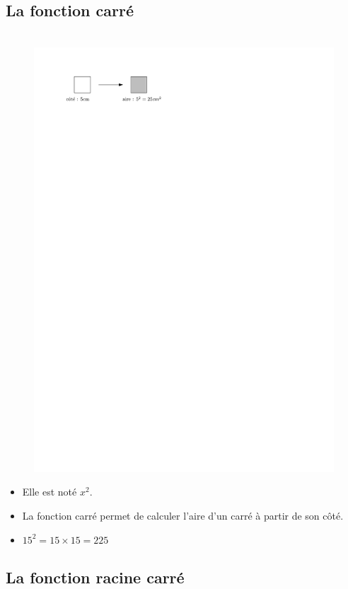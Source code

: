 \documentclass[12pt]{article}
\begin{document}
\begin{multicols}{2}

\subsection*{La fonction carré}

  \begin{figure}[H]
        \centering
        \includegraphics[width=0.8\linewidth]{3x6-pythagore/sources/fonction-carre.pdf}
  \end{figure}

\begin{itemize}
\item Elle est noté $x^2$. 
\item La fonction carré permet de calculer l'aire d'un carré à partir de son côté.
\item $15^2 = 15 \times 15 = 225$
\end{itemize}

\subsection*{La fonction racine carré}


\end{multicols}
\end{document}
